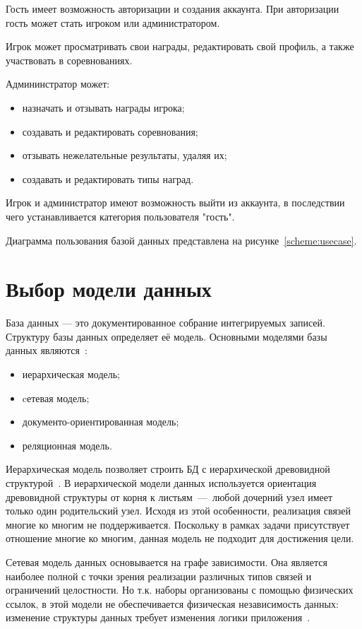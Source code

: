 Гость имеет возможность авторизации и создания аккаунта. При авторизации гость может стать игроком или администратором.

Игрок может просматривать свои награды, редактировать свой профиль, а также участвовать в соревнованиях.

Админинстратор может:
\begin{itemize}
	\item назначать и отзывать награды игрока;
	\item создавать и редактировать соревнования;
	\item отзывать нежелательные результаты, удаляя их;
	\item создавать и редактировать типы наград.
\end{itemize}

Игрок и администратор имеют возможность выйти из аккаунта, в последствии чего устанавливается категория пользователя "гость".

Диаграмма пользования базой данных представлена на рисунке~\ref{scheme:usecase}.


\section{Выбор модели данных}

База данных — это документированное собрание интегрируемых записей.
Структуру базы данных определяет её модель. Основными моделями базы данных являются~\cite{karpova,documentoriented}:
\begin{itemize}
	\item иерархическая модель;
	\item cетевая модель;
	\item документо-ориентированная модель;
	\item реляционная модель.
\end{itemize}

Иерархическая модель позволяет строить БД с иерархической древовидной структурой~\cite{karpova}. В иерархической модели данных используется ориентация древовидной
структуры от корня к листьям~---~любой дочерний узел имеет только один родительский узел. Исходя из этой особенности, реализация связей многие ко многим не поддерживается.
Поскольку в рамках задачи присутствует отношение многие ко многим, данная модель не подходит для достижения цели.

Сетевая модель данных основывается на графе зависимости. Она является наиболее полной с точки зрения реализации различных типов связей и ограничений целостности. Но т.к. наборы организованы с помощью физических ссылок, в этой модели не обеспечивается физическая независимость данных: изменение структуры данных требует изменения логики приложения~\cite{karpova}.

